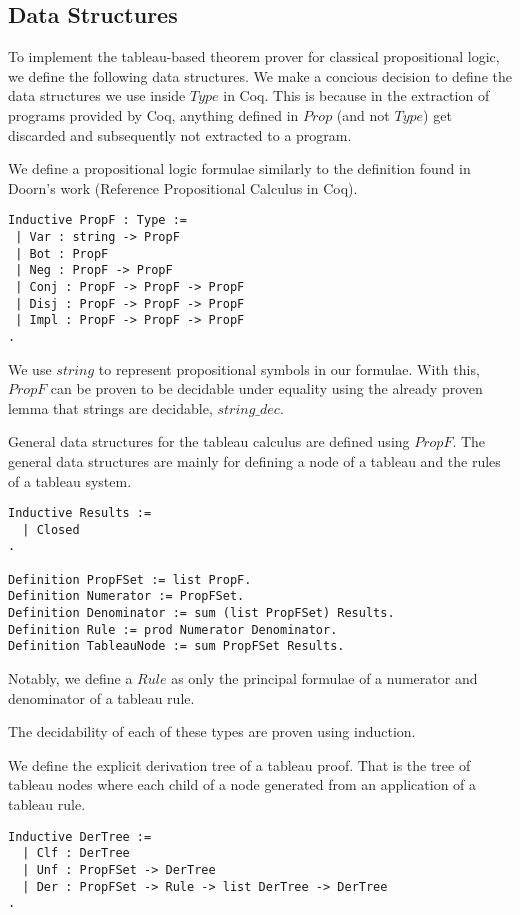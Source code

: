 \subsection{Data Structures}

To implement the tableau-based theorem prover for classical propositional
logic, we define the following data structures. We make a concious decision to
define the data structures we use inside $Type$ in Coq. This is because in the
extraction of programs provided by Coq, anything defined in $Prop$ (and not
$Type$) get discarded and subsequently not extracted to a program.

We define a propositional logic formulae similarly to the definition found in
Doorn's work (Reference Propositional Calculus in Coq).

\begin{lstlisting}
Inductive PropF : Type :=
 | Var : string -> PropF
 | Bot : PropF
 | Neg : PropF -> PropF
 | Conj : PropF -> PropF -> PropF
 | Disj : PropF -> PropF -> PropF
 | Impl : PropF -> PropF -> PropF
.
\end{lstlisting}

We use $string$ to represent propositional symbols in our formulae. With this,
$PropF$ can be proven to be decidable under equality using the already proven
lemma that strings are decidable, $string\_dec$.

General data structures for the tableau calculus are defined using $PropF$.
The general data structures are mainly for defining a node of a tableau and
the rules of a tableau system.

\begin{lstlisting}
Inductive Results :=
  | Closed
.

Definition PropFSet := list PropF.
Definition Numerator := PropFSet.
Definition Denominator := sum (list PropFSet) Results.
Definition Rule := prod Numerator Denominator.
Definition TableauNode := sum PropFSet Results.
\end{lstlisting}

Notably, we define a $Rule$ as only the principal formulae of a numerator and
denominator of a tableau rule.

The decidability of each of these types are proven using induction.

We define the explicit derivation tree of a tableau proof. That is the tree
of tableau nodes where each child of a node generated from an application of a
tableau rule.

\begin{lstlisting}
Inductive DerTree :=
  | Clf : DerTree
  | Unf : PropFSet -> DerTree
  | Der : PropFSet -> Rule -> list DerTree -> DerTree
.
\end{lstlisting}

